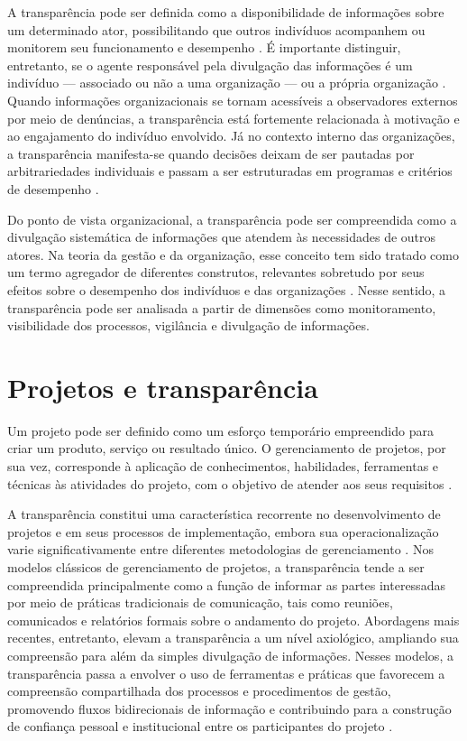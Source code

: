 A transparência pode ser definida como a disponibilidade de informações sobre um determinado ator, possibilitando que outros indivíduos acompanhem ou monitorem seu funcionamento e desempenho \cite{meijer2013understanding}. É importante distinguir, entretanto, se o agente responsável pela divulgação das informações é um indivíduo — associado ou não a uma organização — ou a própria organização \cite{heimstadt2017openwashing}. Quando informações organizacionais se tornam acessíveis a observadores externos por meio de denúncias, a transparência está fortemente relacionada à motivação e ao engajamento do indivíduo envolvido. Já no contexto interno das organizações, a transparência manifesta-se quando decisões deixam de ser pautadas por arbitrariedades individuais e passam a ser estruturadas em programas e critérios de desempenho \cite{meijer2013understanding}.

Do ponto de vista organizacional, a transparência pode ser compreendida como a divulgação sistemática de informações que atendem às necessidades de outros atores. Na teoria da gestão e da organização, esse conceito tem sido tratado como um termo agregador de diferentes construtos, relevantes sobretudo por seus efeitos sobre o desempenho dos indivíduos e das organizações \cite{heimstadt2017openwashing}. Nesse sentido, a transparência pode ser analisada a partir de dimensões como monitoramento, visibilidade dos processos, vigilância e divulgação de informações.

\section{Projetos e transparência}
Um projeto pode ser definido como um esforço temporário empreendido para criar um produto, serviço ou resultado único. O gerenciamento de projetos, por sua vez, corresponde à aplicação de conhecimentos, habilidades, ferramentas e técnicas às atividades do projeto, com o objetivo de atender aos seus requisitos \cite{guide2001project}.

A transparência constitui uma característica recorrente no desenvolvimento de projetos e em seus processos de implementação, embora sua operacionalização varie significativamente entre diferentes metodologias de gerenciamento \cite{betta2018transparency}. Nos modelos clássicos de gerenciamento de projetos, a transparência tende a ser compreendida principalmente como a função de informar as partes interessadas por meio de práticas tradicionais de comunicação, tais como reuniões, comunicados e relatórios formais sobre o andamento do projeto. Abordagens mais recentes, entretanto, elevam a transparência a um nível axiológico, ampliando sua compreensão para além da simples divulgação de informações. Nesses modelos, a transparência passa a envolver o uso de ferramentas e práticas que favorecem a compreensão compartilhada dos processos e procedimentos de gestão, promovendo fluxos bidirecionais de informação e contribuindo para a construção de confiança pessoal e institucional entre os participantes do projeto \cite{betta2018transparency}.

